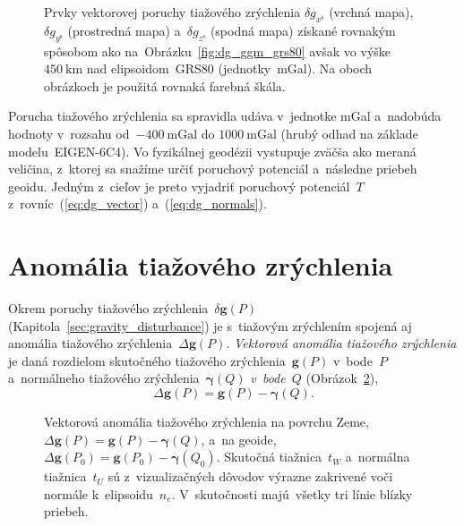 \documentclass[a4paper, 12pt]{book}
\let\vec\mathbf
\begin{document}
\begin{figure}
\caption{Prvky vektorovej poruchy tiažového zrýchlenia $\delta 
g_{x^\mathrm{s}}$ (vrchná mapa), $\delta g_{y^\mathrm{s}}$ (prostredná mapa) 
a~$\delta g_{z^\mathrm{s}}$ (spodná mapa) získané rovnakým spôsobom ako 
na~Obrázku~\ref{fig:dg_ggm_grs80} avšak vo výške~$450\ \mathrm{km}$ nad 
elipsoidom~GRS80 (jednotky~$\mathrm{mGal}$).  Na oboch obrázkoch je použitá 
rovnaká farebná škála.}
\label{fig:dg_ggm_450km}
\end{figure}

Porucha tiažového zrýchlenia sa spravidla udáva v~jednotke mGal a~nadobúda 
hodnoty v~rozsahu od~$-400\ \mathrm{mGal}$ do $1000\ \mathrm{mGal}$ (hrubý 
odhad na základe modelu~EIGEN-6C4).  Vo fyzikálnej geodézii vystupuje zväčša 
ako meraná veličina, z~ktorej sa snažíme určiť poruchový potenciál a~následne 
priebeh geoidu.  Jedným z~cieľov je preto vyjadriť poruchový potenciál~$T$ 
z~rovníc~(\ref{eq:dg_vector}) a~(\ref{eq:dg_normals}).





\section{Anomália tiažového zrýchlenia}
\label{sec:gravity_anomaly}

Okrem poruchy tiažového zrýchlenia~$\delta \vec g(P)$ 
(Kapitola~\ref{sec:gravity_disturbance}) je s~tiažovým zrýchlením spojená aj 
anomália tiažového zrýchlenia~$\Delta \vec g(P)$.  \emph{Vektorová anomália 
tiažového zrýchlenia} je daná rozdielom skutočného tiažového zrýchlenia~$\vec 
g(P)$ v~bode~$P$ a~normálneho tiažového zrýchlenia~$\boldsymbol\gamma(Q)$ 
\emph{v~bode~$Q$} (Obrázok~\ref{fig:gravity_anomaly}),
%
\begin{equation}
\label{eq:Dg_vector_earth}
\Delta \vec g(P) = \vec g(P) - \boldsymbol\gamma(Q).
\end{equation}

\begin{figure}[bt]
\centering

\caption{Vektorová anomália tiažového zrýchlenia na povrchu Zeme,~$\Delta \vec 
g(P) = \vec g(P) - \boldsymbol \gamma(Q)$, a~na geoide, $\Delta \vec g(P_0) 
= \vec g(P_0) - \boldsymbol\gamma(Q_0)$.  Skutočná tiažnica~$t_W$ a~normálna 
tiažnica~$t_U$ sú z~vizualizačných dôvodov výrazne zakrivené voči normále 
k~elipsoidu~$n_e$.  V~skutočnosti majú~všetky tri línie blízky priebeh.}
\label{fig:gravity_anomaly}
\end{figure}
\end{document}
